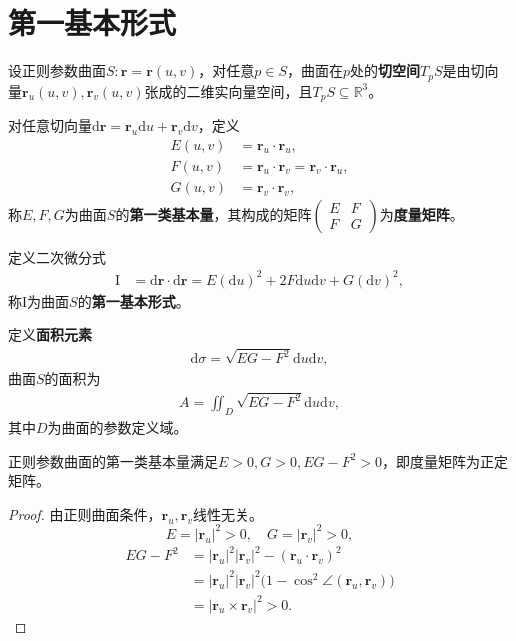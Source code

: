 \documentclass[../../main.tex]{subfiles}%
\begin{document}
\section{第一基本形式}

\begin{definition}
设正则参数曲面$S:\boldsymbol{r}=\boldsymbol{r}(u,v)$，对任意$p\in S$，曲面在$p$处的\textbf{切空间}$T_pS$是由切向量$\boldsymbol{r}_u(u,v),\boldsymbol{r}_v(u,v)$张成的二维实向量空间，且$T_pS\subseteq\mathbb{R}^3$。

对任意切向量$\mathrm{d}\boldsymbol{r}=\boldsymbol{r}_u\mathrm{d}u+\boldsymbol{r}_v\mathrm{d}v$，定义
\begin{align}
E(u,v)&=\boldsymbol{r}_u\cdot\boldsymbol{r}_u,\label{eq:E}\\
F(u,v)&=\boldsymbol{r}_u\cdot\boldsymbol{r}_v=\boldsymbol{r}_v\cdot\boldsymbol{r}_u,\label{eq:F}\\
G(u,v)&=\boldsymbol{r}_v\cdot\boldsymbol{r}_v,\label{eq:G}
\end{align}
称$E,F,G$为曲面$S$的\textbf{第一类基本量}，其构成的矩阵$\begin{pmatrix}E&F\\F&G\end{pmatrix}$为\textbf{度量矩阵}。

定义二次微分式
\begin{align}
\mathrm{I}&=\mathrm{d}\boldsymbol{r}\cdot\mathrm{d}\boldsymbol{r}=E(\mathrm{d}u)^2+2F\mathrm{d}u\mathrm{d}v+G(\mathrm{d}v)^2,\label{eq:firstfundform}
\end{align}
称$\mathrm{I}$为曲面$S$的\textbf{第一基本形式}。

定义\textbf{面积元素}
\begin{align}
\mathrm{d}\sigma=\sqrt{EG-F^2}\mathrm{d}u\mathrm{d}v,\label{eq:areaelement}
\end{align}
曲面$S$的面积为
\begin{align}
A=\iint_D\sqrt{EG-F^2}\mathrm{d}u\mathrm{d}v,\label{eq:area}
\end{align}
其中$D$为曲面的参数定义域。
\end{definition}

\begin{proposition}
正则参数曲面的第一类基本量满足$E>0,G>0,EG-F^2>0$，即度量矩阵为正定矩阵。
\end{proposition}
\begin{proof}

由正则曲面条件，$\boldsymbol{r}_u,\boldsymbol{r}_v$线性无关。
\[
E=|\boldsymbol{r}_u|^2>0,\quad G=|\boldsymbol{r}_v|^2>0,
\]
\begin{align*}
EG-F^2&=|\boldsymbol{r}_u|^2|\boldsymbol{r}_v|^2-(\boldsymbol{r}_u\cdot\boldsymbol{r}_v)^2\\
&=|\boldsymbol{r}_u|^2|\boldsymbol{r}_v|^2\big(1-\cos^2\angle(\boldsymbol{r}_u,\boldsymbol{r}_v)\big)\\
&=|\boldsymbol{r}_u\times\boldsymbol{r}_v|^2>0.
\end{align*}

\end{proof}
\end{document}
